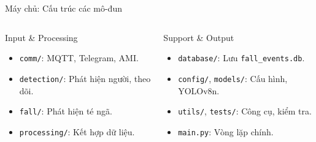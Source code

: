 \begin{frame}{Máy chủ: Cấu trúc các mô-đun}
    \begin{columns}[t]
        \begin{column}{0.48\textwidth}
            \begin{block}{Input \& Processing}
                \begin{itemize}
                    \item \texttt{comm/}: MQTT, Telegram, AMI.
                    \item \texttt{detection/}: Phát hiện người, theo dõi.
                    \item \texttt{fall/}: Phát hiện té ngã.
                    \item \texttt{processing/}: Kết hợp dữ liệu.
                \end{itemize}
            \end{block}
        \end{column}
        \begin{column}{0.48\textwidth}
            \begin{block}{Support \& Output}
                \begin{itemize}
                    \item \texttt{database/}: Lưu \texttt{fall\_events.db}.
                    \item \texttt{config/}, \texttt{models/}: Cấu hình, YOLOv8n.
                    \item \texttt{utils/}, \texttt{tests/}: Công cụ, kiểm tra.
                    \item \texttt{main.py}: Vòng lặp chính.
                \end{itemize}
            \end{block}
        \end{column}
    \end{columns}
    \label{tab:server_modules}
\end{frame}

